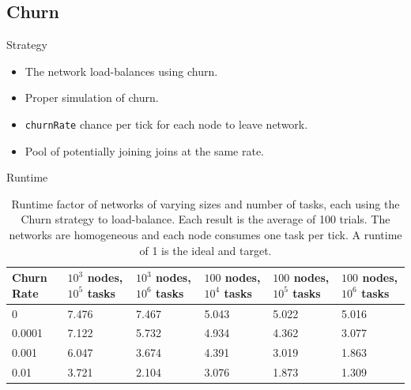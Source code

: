 \documentclass[11pt]{beamer}
\begin{document}
\subsection{Churn}
\begin{frame}{Strategy}
	\begin{itemize}
		
		\item The network load-balances using churn.
		\item Proper simulation of churn.
		\item \texttt{churnRate} chance per tick for each node to leave network.
		\item Pool of potentially joining joins at the same rate.
	\end{itemize}
\end{frame}



\begin{frame}{Runtime}
	\begin{table}[h]
		\small
		\centering
		\caption[Churn Runtimes in a homogenious network]{Runtime factor of networks of varying sizes and number of tasks, each using the Churn strategy to load-balance.  Each result is the average of 100 trials. The networks are homogeneous and each node consumes one task per tick.  A runtime of 1 is the ideal and target.}
		\begin{tabular}{|p{1cm} || p{1cm} | p{1cm} | p{1cm} | p{1cm} | p{1cm} |}
			\hline
			Churn Rate & $ 10^{3}$ nodes, $ 10^{5}$ tasks & $ 10^{3}$ nodes, $ 10^{6}$ tasks & $ 100$ nodes, $ 10^{4}$ tasks & $ 100$ nodes, $ 10^{5}$ tasks &$ 100$ nodes, $ 10^{6}$ tasks \\ \hline
			0      & 7.476   &  7.467 &  5.043& 5.022 &5.016 \\\hline
			0.0001 & 7.122   &  5.732 &  4.934& 4.362&3.077 \\\hline
			0.001  & 6.047   &  3.674 &  4.391& 3.019  &1.863\\\hline
			0.01  &  3.721   &  2.104 &  3.076& 1.873 &1.309\\\hline
			
		\end{tabular}
		\label{tab:ChurnRuntimesHomogenious}
	\end{table}
\end{frame}
\end{document}
